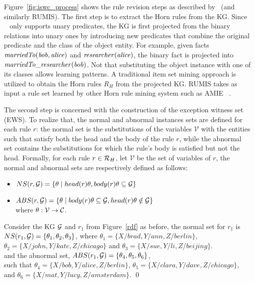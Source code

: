 Figure~\ref{fig:iswc_process} shows the rule revision steps as described by~\cite{gad2016} (and similarly RUMIS). The first step is to extract the Horn rules from the KG. Since ~\cite{gad2016} only supports unary predicates, the KG is first projected from the binary relations into unary ones by introducing new predicates that combine the original predicate and the class of the object entity. For example, given facts $\mathit{marriedTo(bob, alice)}$ and $\mathit{researcher(alice)}$, the binary fact is projected into $\mathit{marriedTo\_researcher(bob)}$. Not that substituting the object instance with one of its classes allows learning patterns. A traditional item set mining approach is utilized to obtain the Horn rules $R_H$ from the projected KG. RUMIS takes as input a rule set learned by other Horn rule mining system such as AMIE ~\cite{amie}.   


The second step is concerned with the construction of the exception witness set (EWS). To realize that, the normal and abnormal instances sets are defined for each rule $r$: the normal set is the substitutions of the variables $\mathcal{V}$ with the entities such that satisfy both the head and the body of the rule $r$, while the abnormal set contains the  substitutions for which the rule's  body is satisfied but not the head.
Formally, for each rule $r \in \mathcal{R}_H$, let $\mathcal{V}$ be the set of variables of $r$, the normal and abnormal sets are respectively defined as follows:
\begin{itemize}
\item $NS(r, \mathcal{G}) = \{\theta \mid head(r)\theta, body(r)\theta \subseteq \mathcal{G}\}$
\item $ABS(r, \mathcal{G}) = \{\theta \mid body(r)\theta \subseteq \mathcal{G} , head(r)\theta \notin \mathcal{G}\}$\\
where $\theta: \mathcal{V} \rightarrow \mathcal{C}$.
\end{itemize}

\begin{example}
Consider the KG $\mathcal{G}$ and $r_1$ from Figure~\ref{rdf} as before, the normal set for $r_1$ is $NS(r_1,\mathcal{G})=\{\theta_1, \theta_2 ,\theta_3\}$, where $\theta_1 = \{X/brad, Y/ann, Z/berlin\}$,\\  $\theta_2 = \{X/john, Y/kate, Z/chicago\}$ and $\theta_3 = \{X/sue, Y/li, Z/beijing\}$.\\ and the abnormal set, $ABS(r_1,\mathcal{G})=\{\theta_4,\theta_5, \theta_6\}$, \\such that $\theta_4=\{X/bob, Y/alice, Z/berlin\}$,  $\theta_5=\{X/clara, Y/dave, Z/chicago\}$, and $\theta_6=\{X/mat, Y/lucy, Z/amsterdam\}$.
\qed
\end{example}

